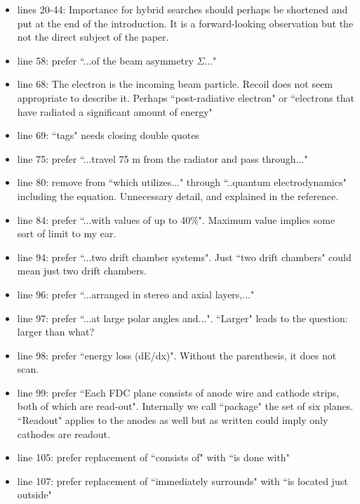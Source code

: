 \documentclass{article}
\begin{document}
\begin{itemize}
\item lines 20-44: Importance for hybrid searches should perhaps be shortened and put at the end of the introduction. It is a forward-looking observation but the not the direct subject of the paper.
\item line 58: prefer ``...of the beam asymmetry $\Sigma$..."
\item line 68: The electron is the incoming beam particle. Recoil does not seem appropriate to describe it. Perhaps ``post-radiative electron" or ``electrons that have radiated a significant amount of energy"
\item line 69: ``tags" needs closing double quotes
\item line 75: prefer ``...travel 75 m from the radiator and pass through..."
\item line 80: remove from ``which utilizes..." through ``..quantum electrodynamics" including the equation. Unnecessary detail, and explained in the reference.
\item line 84: prefer ``...with values of up to 40\%". Maximum value implies some sort of limit to my ear.
\item line 94: prefer ``...two drift chamber systems". Just ``two drift chambers" could mean just two drift chambers.
\item line 96: prefer ``...arranged in stereo and axial layers,..."
\item line 97: prefer ``...at large polar angles and...". ``Larger" leads to the question: larger than what?
\item line 98: prefer ``energy loss (dE/dx)". Without the parenthesis, it does not scan.
\item line 99: prefer ``Each FDC plane consists of anode wire and cathode strips, both of which are read-out". Internally we call ``package" the set of six planes. ``Readout" applies to the anodes as well but as written could imply only cathodes are readout.
\item line 105:  prefer replacement  of ``consists of" with ``is done with" 
\item line 107: prefer replacement of ``immediately surrounds" with ``is located just outside"
\end{itemize}
\end{document}
